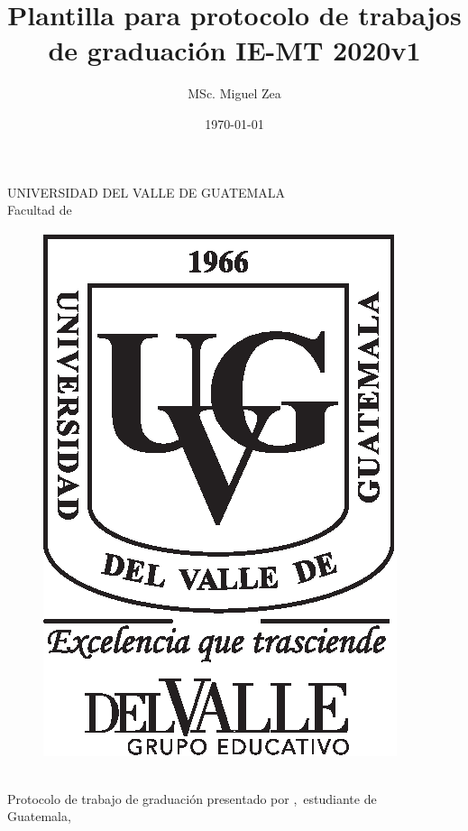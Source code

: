 \documentclass[11pt, letterpaper, twoside, openright]{report}
\title{Plantilla para protocolo de trabajos de graduación IE-MT 2020v1}
\author{MSc. Miguel Zea}
\date{\today}
\begin{document}
\graphicspath{{figuras/}}


\newpage
\cleardoublepage{}
\pagecolor{white}
\color{black}
\setcounter{page}{1}
\thispagestyle{empty}
\begin{center}
	\LARGE UNIVERSIDAD DEL VALLE DE GUATEMALA\\
	\LARGE Facultad de \uvgfacultad \\[0.75cm]
\end{center}
\begin{figure}[h]
	\begin{center}
	\includegraphics[height=5.5 cm]{plantilla/escudoUVGnegro.eps}
	\vspace{0.5in}
	\end{center}
\end{figure}
\begin{center}
	\Large \textbf{\nohyphens{\titulotesis}} \\
	\vfill
	\Large \nohyphens{Protocolo de trabajo de graduación presentado por \nombreestudiante,\ estudiante de \uvgcarrera} \\
	\vfill
	\large Guatemala, \\
	\vspace{1em}
	\anoentrega
\end{center}


\pagestyle{plain}

\newpage
\cleardoublepage
{}
\setcounter{page}{1}
\end{document}
